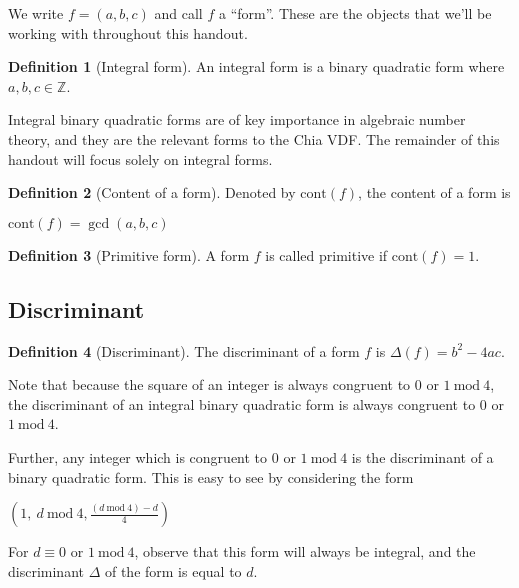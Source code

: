 \documentclass{article}
\theoremstyle{definition}
\newtheorem{definition}{Definition}[section]
\theoremstyle{theorem}
\theoremstyle{example}
\theoremstyle{corollary}
\begin{document}
\bigskip

We write \(f = (a, b, c)\) and call \(f\) a ``form''. These are the objects that we'll be working with throughout this handout.

\bigskip

\theoremstyle{definition}
\begin{definition}[Integral form]
An integral form is a binary quadratic form where \(a, b, c \in \mathbb{Z}\).
\end{definition}

\bigskip

Integral binary quadratic forms are of key importance in algebraic number theory, and they are the relevant forms to the Chia VDF. The remainder of this handout will focus solely on integral forms.

\bigskip

\theoremstyle{definition}
\begin{definition}[Content of a form]
Denoted by \(\textrm{cont}(f)\), the content of a form is
\begin{center}
\(\textrm{cont}(f) = \gcd(a, b, c)\)
\end{center}
\end{definition}

\bigskip

\theoremstyle{definition}
\begin{definition}[Primitive form]
A form \(f\) is called primitive if \(\textrm{cont}(f) = 1\).
\end{definition}

\bigskip

\subsection{Discriminant}

\bigskip

\theoremstyle{definition}
\begin{definition}[Discriminant]
The discriminant of a form \(f\) is \(\Delta(f) = b^{2} - 4ac\).
\end{definition}

\bigskip

Note that because the square of an integer is always congruent to \(0\) or \(1 \ \textrm{mod} \ 4\), the discriminant of an integral binary quadratic form is always congruent to \(0\) or \(1 \ \textrm{mod} \ 4\).

\bigskip

Further, any integer which is congruent to \(0\) or \(1 \ \textrm{mod} \ 4\) is the discriminant of a binary quadratic form. This is easy to see by considering the form
\begin{center}
\(\left(1,\ d \ \textrm{mod} \ 4, \frac{(d \ \textrm{mod} \ 4) - d}{4}\right)\)
\end{center}
For \(d \equiv 0\) or \(1 \ \textrm{mod} \ 4\), observe that this form will always be integral, and the discriminant \(\Delta\) of the form is equal to \(d\).
\end{document}
